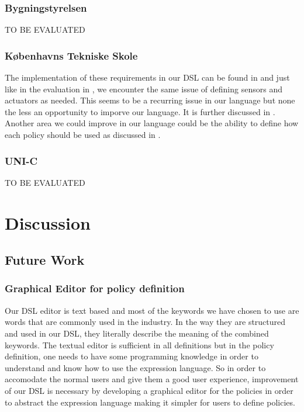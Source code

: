 \documentclass{llncs}
\begin{document}
\subsubsection{Bygningstyrelsen}\label{subsec:bygstyrelsen}
TO BE EVALUATED

\subsubsection{K\o benhavns Tekniske Skole}\label{subsec:kts}
The implementation of these requirements in our DSL can be found in  and just like in the evaluation in , we encounter the same issue of defining sensors and actuators as needed. This seems to be a recurring issue in our language but none the less an opportunity to imporve our language. It is further discussed in . 
Another area we could improve in our language could be the ability to define how each policy should be used as discussed in . 
 
\subsubsection{UNI-C}\label{subsec:uni-c}
TO BE EVALUATED

\section{Discussion}\label{sec:discussion}
\subsection{Future Work}\label{subsec:futurework}

\subsubsection{Graphical Editor for policy definition}\label{subsec:graphicaleditor}
Our DSL editor is text based and most of the keywords we have chosen to use are words that are commonly used in the industry. In the way they are structured and used in our DSL, they literally describe the meaning of the combined keywords. The textual editor is sufficient in all definitions but in the policy definition, one needs to have some programming knowledge in order to understand and know how to use the expression language. So in order to accomodate the normal users and give them a good user experience, improvement of our DSL is necessary by developing a graphical editor for the policies in order to abstract the expression language making it simpler for users to define policies.
\end{document}

